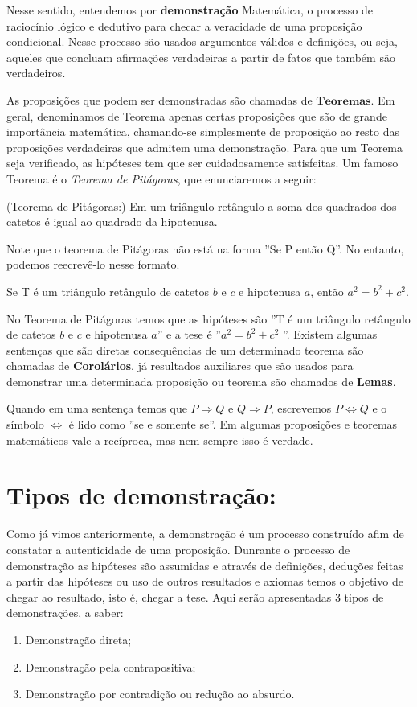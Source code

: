 Nesse sentido, entendemos por \textbf{demonstração} Matemática, o processo de raciocínio lógico e dedutivo para checar a veracidade de uma proposição condicional. Nesse processo são usados argumentos válidos e definições, ou seja, aqueles
que concluam afirmações verdadeiras a partir de fatos que também
são verdadeiros.

As proposições que podem ser demonstradas são chamadas de $\textbf{Teoremas}$. Em geral, denominamos de Teorema apenas certas proposições que são de grande importância matemática, chamando-se simplesmente de proposição ao resto das proposições verdadeiras que admitem uma demonstração. Para que um Teorema seja verificado, as hipóteses tem que ser cuidadosamente satisfeitas. Um famoso Teorema é o \textit{Teorema de Pitágoras}, que enunciaremos a seguir:

\begin{teo} (Teorema de Pitágoras:) Em um triângulo retângulo a
soma dos quadrados dos catetos é igual ao quadrado da hipotenusa.
\end{teo}

Note que o teorema de Pitágoras não está na forma ''Se P então Q''. No entanto, podemos reecrevê-lo nesse formato.

\begin{teo}
Se T é um triângulo retângulo
de catetos $b$ e $c$ e hipotenusa $a$, então $a^2=b^2+c^2$.
\end{teo}
No Teorema de Pitágoras temos que as hipóteses são ''T é um triângulo retângulo
de catetos $b$ e $c$ e hipotenusa $a$'' e a tese é ''$a^2=b^2+c^2$ ''.
Existem algumas sentenças que são diretas consequências de um determinado teorema são chamadas de \textbf{Corolários}, já resultados auxiliares que são usados para demonstrar uma determinada proposição ou teorema são chamados de \textbf{Lemas}.

Quando em uma sentença temos que $P \Rightarrow Q$ e $Q \Rightarrow P$, escrevemos $P \Leftrightarrow Q$ e o símbolo $\Leftrightarrow$ é lido como ''se e somente se''. Em algumas proposições e teoremas matemáticos vale a recíproca, mas nem sempre isso é verdade.
\section{Tipos de demonstração:}
Como já vimos anteriormente, a demonstração  é um processo construído afim de constatar a autenticidade de uma proposição. Dunrante o processo de demonstração as hipóteses são assumidas e através de definições, deduções feitas a partir das hipóteses ou uso de outros resultados e axiomas temos o objetivo de chegar ao resultado, isto é, chegar a tese. Aqui serão apresentadas 3 tipos de demonstrações, a saber:
\begin{enumerate}
    \item Demonstração direta;
    \item Demonstração pela contrapositiva;
    \item Demonstração por contradição ou redução ao absurdo.
\end{enumerate}
